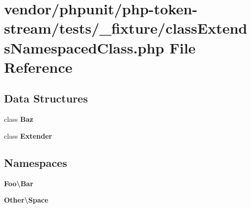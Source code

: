\section{vendor/phpunit/php-\/token-\/stream/tests/\+\_\+fixture/class\+Extends\+Namespaced\+Class.php File Reference}
\label{class_extends_namespaced_class_8php}
\subsection*{Data Structures}
\begin{DoxyCompactItemize}
\item 
class {\bf Baz}
\item 
class {\bf Extender}
\end{DoxyCompactItemize}
\subsection*{Namespaces}
\begin{DoxyCompactItemize}
\item 
 {\bf Foo\textbackslash{}\+Bar}
\item 
 {\bf Other\textbackslash{}\+Space}
\end{DoxyCompactItemize}
